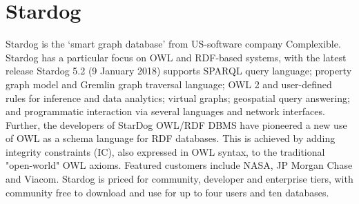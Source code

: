 \section{Stardog}
Stardog is the ‘smart graph database’ from US-software company Complexible. Stardog has a particular focus on OWL and RDF-based systems, with the latest release Stardog 5.2 (9 January 2018) supports SPARQL query language; property graph model and Gremlin graph traversal language; OWL 2 and user-defined rules for inference and data analytics; virtual graphs; geospatial query answering; and programmatic interaction via several languages and network interfaces.\cite{stardog-docs} Further, the developers of StarDog OWL/RDF DBMS have pioneered a new use of OWL as a schema language for RDF databases. This is achieved by adding integrity constraints (IC), also expressed in OWL syntax, to the traditional "open-world" OWL axioms.\cite{stardog-schema} Featured customers include NASA, JP Morgan Chase and Viacom. Stardog is priced for community, developer and enterprise tiers, with community free to download and use for up to four users and ten databases.\cite{stardog-computerword}
 
 

